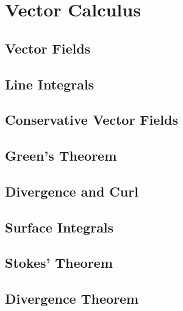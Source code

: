 \documentclass[../calc3.tex]{subfiles}
\begin{document}
\chapter{Vector Calculus}
\section{Vector Fields}
\section{Line Integrals}
\section{Conservative Vector Fields}
\section{Green's Theorem}
\section{Divergence and Curl}
\section{Surface Integrals}
\section{Stokes' Theorem}
\section{Divergence Theorem}
\end{document}
